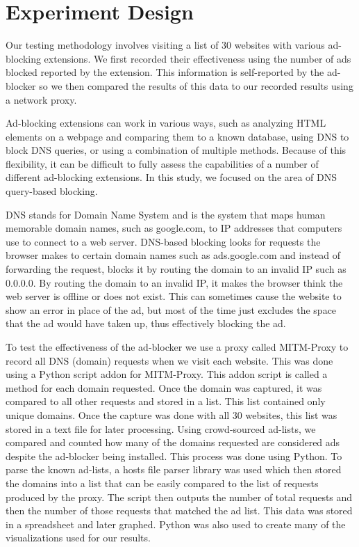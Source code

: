 \documentclass[sigsmall]{acmart}
\begin{document}
\section*{Experiment Design} \label{ED}
Our testing methodology involves visiting a list of 30 websites with various ad-blocking extensions. We first recorded their effectiveness using the number of ads blocked reported by the extension. This information is self-reported by the ad-blocker so we then compared the results of this data to our recorded results using a network proxy.

Ad-blocking extensions can work in various ways, such as analyzing HTML elements on a webpage and comparing them to a known database, using DNS to block DNS queries, or using a combination of multiple methods. Because of this flexibility, it can be difficult to fully assess the capabilities of a number of different ad-blocking extensions. In this study, we focused on the area of DNS query-based blocking.

DNS stands for Domain Name System and is the system that maps human memorable domain names, such as google.com, to IP addresses that computers use to connect to a web server. DNS-based blocking looks for requests the browser makes to certain domain names such as ads.google.com and instead of forwarding the request, blocks it by routing the domain to an invalid IP such as 0.0.0.0. By routing the domain to an invalid IP, it makes the browser think the web server is offline or does not exist. This can sometimes cause the website to show an error in place of the ad, but most of the time just excludes the space that the ad would have taken up, thus effectively blocking the ad.

To test the effectiveness of the ad-blocker we use a proxy called MITM-Proxy to record all DNS (domain) requests when we visit each website. This was done using a Python script addon for MITM-Proxy. This addon script is called a method for each domain requested. Once the domain was captured, it was compared to all other requests and stored in a list. This list contained only unique domains. Once the capture was done with all 30 websites, this list was stored in a text file for later processing. Using crowd-sourced ad-lists, we compared and counted how many of the domains requested are considered ads despite the ad-blocker being installed. This process was done using Python. To parse the known ad-lists, a hosts file parser library was used which then stored the domains into a list that can be easily compared to the list of requests produced by the proxy. The script then outputs the number of total requests and then the number of those requests that matched the ad list. This data was stored in a spreadsheet and later graphed. Python was also used to create many of the visualizations used for our results.
\end{document}
